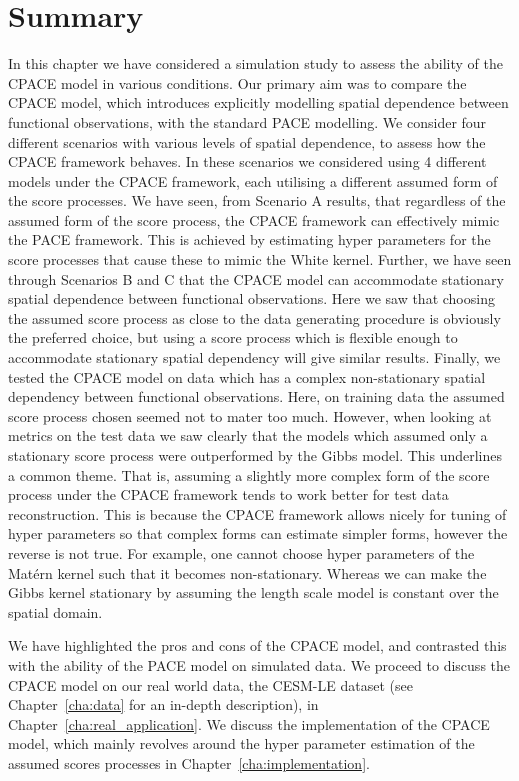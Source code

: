 \section{Summary\label{sec:sim_summ}}
In this chapter we have considered a simulation study to assess the ability of the CPACE model in various conditions.
Our primary aim was to compare the CPACE model, which introduces explicitly modelling spatial dependence between functional observations, with the standard PACE modelling.
We consider four different scenarios with various levels of spatial dependence, to assess how the CPACE framework behaves.
In these scenarios we considered using 4 different models under the CPACE framework, each utilising a different assumed form of the score processes.
We have seen, from Scenario A results, that regardless of the assumed form of the score process, the CPACE framework can effectively mimic the PACE framework.
This is achieved by estimating hyper parameters for the score processes that cause these to mimic the White kernel. 
Further, we have seen through Scenarios B and C that the CPACE model can accommodate stationary spatial dependence between functional observations.
Here we saw that choosing the assumed score process as close to the data generating procedure is obviously the preferred choice, but using a score process which is flexible enough to accommodate  stationary spatial dependency will give similar results.
Finally, we tested the CPACE model on data which has a complex non-stationary spatial dependency between functional observations.
Here, on training data the assumed score process chosen seemed not to mater too much. 
However, when looking at metrics on the test data we saw clearly that the models which assumed only a stationary score process were outperformed by the Gibbs model.
This underlines a common theme. That is, assuming a slightly more complex form of the score process under the CPACE framework tends to work better for test data reconstruction.
This is because the CPACE framework allows nicely for tuning of hyper parameters so that complex forms can estimate simpler forms, however the reverse is not true. 
For example, one cannot choose hyper parameters of the Mat\'ern kernel such that it becomes non-stationary.
Whereas we can make the Gibbs kernel stationary by assuming the length scale model is constant over the spatial domain. 

We have highlighted the pros and cons of the CPACE model, and contrasted this with the ability of the PACE model on simulated data.
We proceed to discuss the CPACE model on our real world data, the CESM-LE dataset (see Chapter~\ref{cha:data} for an in-depth description), in Chapter~\ref{cha:real_application}.
We discuss the implementation of the CPACE model, which mainly revolves around the hyper parameter estimation of the assumed scores processes in Chapter~\ref{cha:implementation}.




